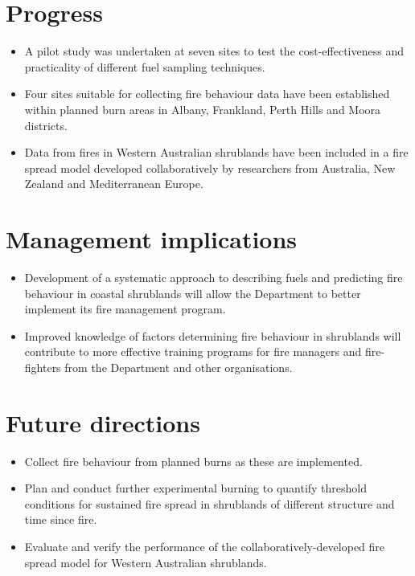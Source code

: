 \documentclass[version=last, paper=a4, DIV=18, usenames, dvipsnames]{scrartcl}
\begin{document}
\section*{Progress}
\begin{itemize}
\itemsep1pt\parskip0pt
\item
  A pilot study was undertaken at seven sites to test the
  cost-effectiveness and practicality of different fuel sampling
  techniques.
\item
  Four sites suitable for collecting fire behaviour data have been
  established within planned burn areas in Albany, Frankland, Perth
  Hills and Moora districts.
\item
  Data from fires in Western Australian shrublands have been included in
  a fire spread model developed collaboratively by researchers from
  Australia, New Zealand and Mediterranean Europe.
\end{itemize}



\section*{Management implications}
\begin{itemize}
\itemsep1pt\parskip0pt
\item
  Development of a systematic approach to describing fuels and
  predicting fire behaviour in coastal shrublands will allow the
  Department to better implement its fire management program.
\item
  Improved knowledge of factors determining fire behaviour in shrublands
  will contribute to more effective training programs for fire managers
  and fire-fighters from the Department and other organisations.
\end{itemize}



\section*{Future directions}
\begin{itemize}
\itemsep1pt\parskip0pt
\item
  Collect fire behaviour from planned burns as these are implemented.
\item
  Plan and conduct further experimental burning to quantify threshold
  conditions for sustained fire spread in shrublands of different
  structure and time since fire.
\item
  Evaluate and verify the performance of the collaboratively-developed
  fire spread model for Western Australian shrublands.
\end{itemize}




\clearpage
\end{document}
